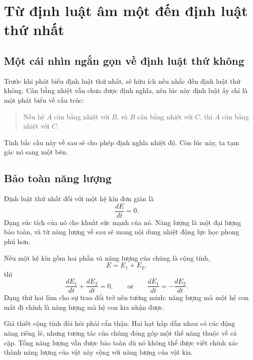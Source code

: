 \section{Từ định luật âm một đến định luật thứ nhất}

\subsection{Một cái nhìn ngắn gọn về định luật thứ không}

Trước khi phát biểu định luật thứ nhất, sẽ hữu ích nếu nhắc đến định luật thứ không. Cân bằng nhiệt vẫn chưa được định nghĩa, nên lúc này định luật ấy chỉ là một phát biểu về cấu trúc:
\begin{quote}
Nếu hệ \(A\) cân bằng nhiệt với \(B\), và \(B\) cân bằng nhiệt với \(C\), thì \(A\) cân bằng nhiệt với \(C\).
\end{quote}
Tính bắc cầu này về sau sẽ cho phép định nghĩa nhiệt độ. Còn lúc này, ta tạm gác nó sang một bên.

\subsection{Bảo toàn năng lượng}

Định luật thứ nhất đối với một hệ kín đơn giản là
\begin{equation}
 \frac{dE}{dt}=0.
 \label{eq:sm1-first-law}
\end{equation}
Dạng súc tích của nó che khuất sức mạnh của nó. Năng lượng là một đại lượng bảo toàn, và từ năng lượng về sau sẽ mang nội dung nhiệt động lực học phong phú hơn.

Nếu một hệ kín gồm hai phần và năng lượng của chúng là cộng tính,
\begin{equation}
 E=E_1+E_2,
\end{equation}
thì
\begin{equation}
 \frac{dE_1}{dt}+\frac{dE_2}{dt}=0,
 \qquad\text{or}\qquad
 \frac{dE_1}{dt}=-\frac{dE_2}{dt}.
 \label{eq:sm1-energy-exchange}
\end{equation}
Dạng thứ hai làm cho sự trao đổi trở nên tường minh: năng lượng mà một hệ con mất đi chính là năng lượng mà hệ con kia nhận được.

Giả thiết cộng tính đòi hỏi phải cẩn thận. Hai hạt hấp dẫn nhau có các động năng riêng lẻ, nhưng tương tác của chúng đóng góp một thế năng thuộc về cả cặp. Tổng năng lượng vẫn được bảo toàn dù nó không thể được viết chính xác thành năng lượng của vật này cộng với năng lượng của vật kia.

